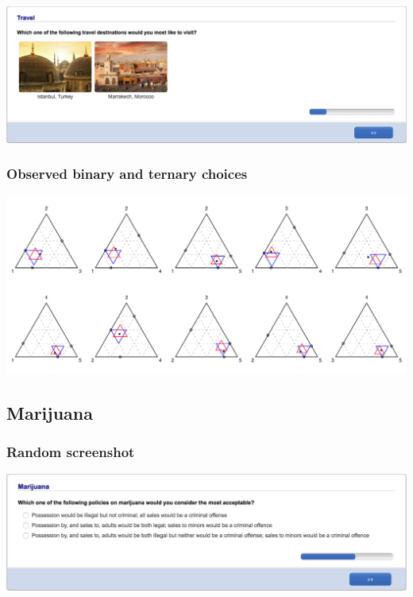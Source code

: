 \documentclass[11pt,letter]{article}
\begin{document}
\includegraphics[width=15cm]{Population_study_design/screenshot_Travel.png}

\subsubsection*{Observed binary and ternary choices}

\includegraphics[width=15cm]{./Population_study_data/Simplexes/Travel.pdf}

\pagebreak

\subsection{Marijuana}



\subsubsection*{Random screenshot}

\includegraphics[width=15cm]{Population_study_design/screenshot_Marijuana.png}
\end{document}
